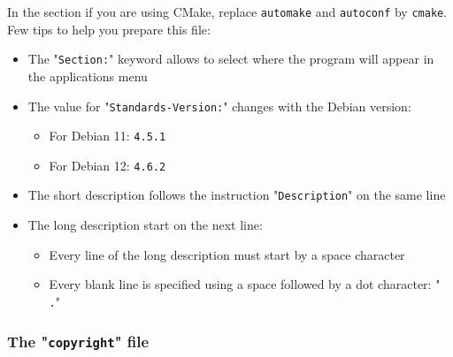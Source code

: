 \noindent In the  section if you are using CMake, replace \texttt{automake} and \texttt{autoconf} by \texttt{cmake}. 
\newpage
\noindent Few tips to help you prepare this file:
\begin{itemize}
\item The "\texttt{Section:}" keyword allows to select where the program will appear in the applications menu
\item The value for "\texttt{Standards-Version:}" changes with the Debian version:
\begin{itemize} 
\item For Debian 11: \texttt{4.5.1}
\item For Debian 12: \texttt{4.6.2}
\end{itemize}
\item The short description follows the instruction "\texttt{Description}" on the same line
\item The long description start on the next line: 
\begin{itemize}
\item Every line of the long description must start by a space character
\item Every blank line is specified using a space followed by a dot character: "\texttt{ .}"
\end{itemize}
\end{itemize}

\subsubsection{The "\texttt{copyright}" file}

